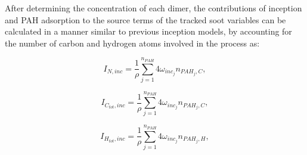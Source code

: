 
After determining the concentration of each dimer, the contributions of inception and PAH adsorption to the source terms of the tracked soot variables can be calculated in a manner similar to previous inception models, by accounting for the number of carbon and hydrogen atoms involved in the process as:

\begin{equation}
	I_{N,{inc}} = \frac{1}{\rho}
	\sum_{j=1}^{n_{PAH}}
	4\omega_{inc_{j}} 
	n_{PAH_j,C}
	\label{eqn:IN_inc_dimcoal},
\end{equation}

\begin{equation}
	I_{C_{tot},{inc}} = \frac{1}{\rho}
	\sum_{j=1}^{n_{PAH}}
	4\omega_{inc_{j}} 
	n_{PAH_j,C}
	\label{eqn:ICtot_inc_dimcoal},
\end{equation}

\begin{equation}
	I_{H_{tot},{inc}} = \frac{1}{\rho}
	\sum_{j=1}^{n_{PAH}}
	4\omega_{inc_{j}} 
	n_{PAH_j,H}
	\label{eqn:IHtot_inc_dimcoal},
\end{equation}

